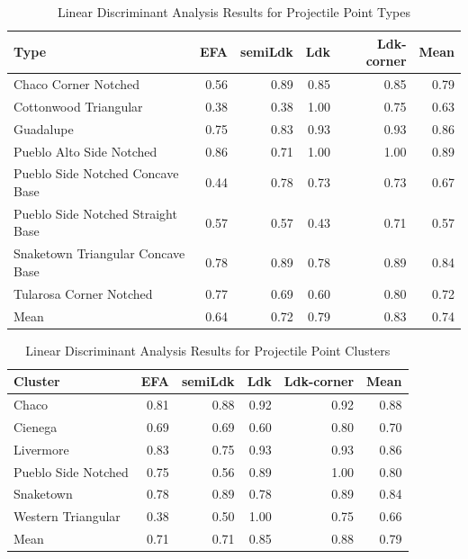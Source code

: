 \documentclass[a4paper]{article}
\begin{document}
\begin{table}

\caption{\label{tab:LDAResultsType}Linear Discriminant Analysis Results for Projectile Point Types}
\centering
\begin{tabular}[t]{lrrrrr}
\toprule
Type & EFA & semiLdk & Ldk & Ldk-corner & Mean\\
\midrule
Chaco Corner Notched & 0.56 & 0.89 & 0.85 & 0.85 & 0.79\\
Cottonwood Triangular & 0.38 & 0.38 & 1.00 & 0.75 & 0.63\\
Guadalupe & 0.75 & 0.83 & 0.93 & 0.93 & 0.86\\
Pueblo Alto Side Notched & 0.86 & 0.71 & 1.00 & 1.00 & 0.89\\
Pueblo Side Notched Concave Base & 0.44 & 0.78 & 0.73 & 0.73 & 0.67\\
\addlinespace
Pueblo Side Notched Straight Base & 0.57 & 0.57 & 0.43 & 0.71 & 0.57\\
Snaketown Triangular Concave Base & 0.78 & 0.89 & 0.78 & 0.89 & 0.84\\
Tularosa Corner Notched & 0.77 & 0.69 & 0.60 & 0.80 & 0.72\\
Mean & 0.64 & 0.72 & 0.79 & 0.83 & 0.74\\
\bottomrule
\end{tabular}
\end{table}

\begin{table}

\caption{\label{tab:LDAResultsCluster}Linear Discriminant Analysis Results for Projectile Point Clusters}
\centering
\begin{tabular}[t]{lrrrrr}
\toprule
Cluster & EFA & semiLdk & Ldk & Ldk-corner & Mean\\
\midrule
Chaco & 0.81 & 0.88 & 0.92 & 0.92 & 0.88\\
Cienega & 0.69 & 0.69 & 0.60 & 0.80 & 0.70\\
Livermore & 0.83 & 0.75 & 0.93 & 0.93 & 0.86\\
Pueblo Side Notched & 0.75 & 0.56 & 0.89 & 1.00 & 0.80\\
Snaketown & 0.78 & 0.89 & 0.78 & 0.89 & 0.84\\
\addlinespace
Western Triangular & 0.38 & 0.50 & 1.00 & 0.75 & 0.66\\
Mean & 0.71 & 0.71 & 0.85 & 0.88 & 0.79\\
\bottomrule
\end{tabular}
\end{table}
\end{document}
